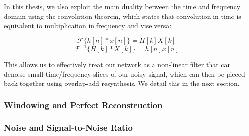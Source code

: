 In this thesis, we also exploit the main duality between the time and frequency domain using the convolution theorem, which states that convolution in time is equivalent to multiplication in frequency and vise versa:

\begin{equation}
\mathscr{F} \{h[n] * x[n]\} = H[k] X[k]
\end{equation}
\begin{equation}
\mathscr{F}^{-1} \{H[k] * X[k]\} = h[n] x[n]
\end{equation}

This allows us to effectively treat our network as a non-linear filter that can denoise small time/frequency slices of our noisy signal, which can then be pieced back together using overlap-add resynthesis. We detail this in the next section.

\subsubsection{Windowing and Perfect Reconstruction}



\subsubsection{Noise and Signal-to-Noise Ratio}
